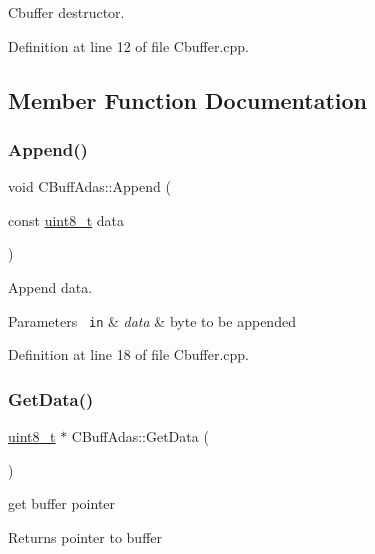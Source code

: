 Cbuffer destructor. 



Definition at line 12 of file Cbuffer.\+cpp.



\subsection{Member Function Documentation}
\mbox{\label{class_c_buff_adas_aceac4b71872e406861286959f578c89b}} 
\subsubsection{\texorpdfstring{Append()}{Append()}}
{\footnotesize\ttfamily void C\+Buff\+Adas\+::\+Append (\begin{DoxyParamCaption}\item[{const \mbox{\hyperlink{_a_d_a_s___types_8h_aba7bc1797add20fe3efdf37ced1182c5}{uint8\+\_\+t}}}]{data }\end{DoxyParamCaption})}



Append data. 


\begin{DoxyParams}[1]{Parameters}
\mbox{\texttt{ in}}  & {\em data} & byte to be appended \\
\hline
\end{DoxyParams}


Definition at line 18 of file Cbuffer.\+cpp.

\mbox{\label{class_c_buff_adas_a56fdcdc9766874d3a6fef04119ee91f9}} 
\subsubsection{\texorpdfstring{GetData()}{GetData()}}
{\footnotesize\ttfamily \mbox{\hyperlink{_a_d_a_s___types_8h_aba7bc1797add20fe3efdf37ced1182c5}{uint8\+\_\+t}} $\ast$ C\+Buff\+Adas\+::\+Get\+Data (\begin{DoxyParamCaption}{ }\end{DoxyParamCaption})}



get buffer pointer 

\begin{DoxyReturn}{Returns}
pointer to buffer 
\end{DoxyReturn}


